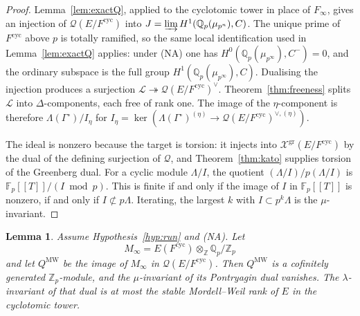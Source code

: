 \documentclass[11pt]{article}
\newtheorem{lemma}[theorem]{Lemma}
\theoremstyle{definition}
\theoremstyle{remark}
\newcommand{\Z}{\mathbb{Z}}
\newcommand{\Q}{\mathbb{Q}}
\newcommand{\F}{\mathbb{F}}
\newcommand{\cyc}{\mathrm{cyc}}
\newcommand{\gr}{\mathrm{gr}}
\newcommand{\cL}{\mathcal{L}}
\newcommand{\cX}{\mathcal{X}}
\newcommand{\cQ}{\mathcal{Q}}
\newcommand{\Lam}{\Lambda}
\newcommand{\Gam}{\Gamma^{\circ}}
\begin{document}
\begin{proof}
Lemma~\ref{lem:exactQ}, applied to the cyclotomic tower in place of \(F_\infty\), gives an injection of \(\cQ(E/F^{\cyc})\) into \(J=\varinjlim H^1(\Q_p(\mu_{p^n}),C)\). The unique prime of \(F^{\cyc}\) above \(p\) is totally ramified, so the same local identification used in Lemma~\ref{lem:exactQ} applies: under (NA) one has \(H^0(\Q_p(\mu_{p^\infty}),C^-)=0\), and the ordinary subspace is the full group \(H^1(\Q_p(\mu_{p^\infty}),C)\). Dualising the injection produces a surjection \(\cL\twoheadrightarrow\cQ(E/F^{\cyc})^\vee\). Theorem~\ref{thm:freeness} splits \(\cL\) into \(\Delta\)-components, each free of rank one. The image of the \(\eta\)-component is therefore \(\Lam(\Gam)/I_\eta\) for \(I_\eta=\ker(\Lam(\Gam)^{(\eta)}\to\cQ(E/F^{\cyc})^{\vee,(\eta)})\).

The ideal is nonzero because the target is torsion: it injects into \(\cX^{\gr}(E/F^{\cyc})\) by the dual of the defining surjection of \(\cQ\), and Theorem~\ref{thm:kato} supplies torsion of the Greenberg dual. For a cyclic module \(\Lam/I\), the quotient \((\Lam/I)/p(\Lam/I)\) is \(\F_p[[T]]/(I\bmod p)\). This is finite if and only if the image of \(I\) in \(\F_p[[T]]\) is nonzero, if and only if \(I\not\subset p\Lam\). Iterating, the largest \(k\) with \(I\subset p^k\Lam\) is the \(\mu\)-invariant.
\end{proof}

\begin{lemma}
\label{lem:MW}
Assume Hypothesis~\ref{hyp:run} and \textup{(NA)}. Let
\[
M_\infty=E(F^{\cyc})\otimes_{\Z}\Q_p/\Z_p
\]
and let \(Q^{\mathrm{MW}}\) be the image of \(M_\infty\) in \(\cQ(E/F^{\cyc})\). Then \(Q^{\mathrm{MW}}\) is a cofinitely generated \(\Z_p\)-module, and the \(\mu\)-invariant of its Pontryagin dual vanishes. The \(\lambda\)-invariant of that dual is at most the stable Mordell--Weil rank of \(E\) in the cyclotomic tower.
\end{lemma}
\end{document}
